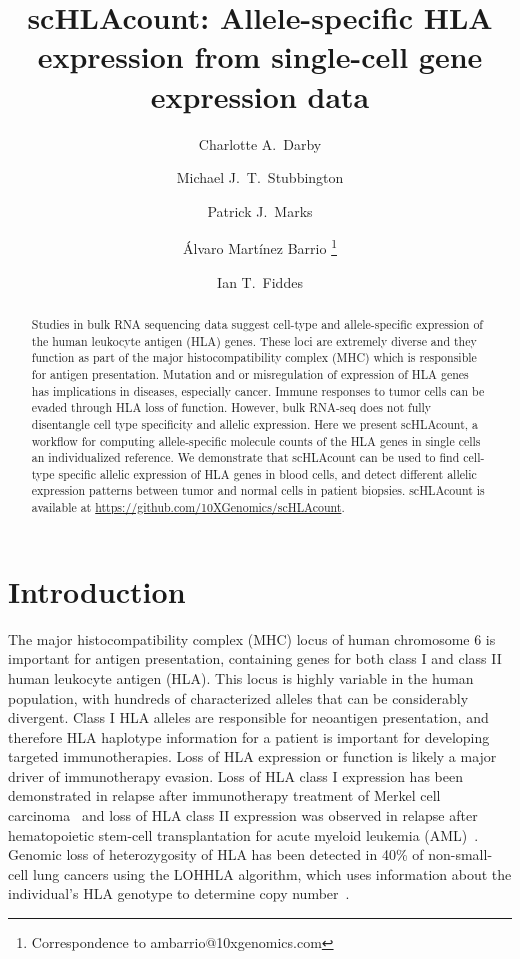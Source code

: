 \documentclass{article}[12pt]
\title{scHLAcount: Allele-specific HLA expression from single-cell gene expression data}
\author[1]{Charlotte A.~Darby}
\author[2]{Michael J.~T.~Stubbington}
\author[2]{Patrick J.~Marks}
\author[2]{Álvaro Martínez Barrio \thanks{Correspondence to ambarrio@10xgenomics.com}}
\author[2]{Ian T.~Fiddes}
\affil[1]{Department of Computer Science, Johns Hopkins University, Baltimore MD}
\affil[2]{10x Genomics, Pleasanton CA}
\begin{document}
\maketitle

\begin{abstract}
Studies in bulk RNA sequencing data suggest cell-type and allele-specific expression of the human leukocyte antigen (HLA) genes. These loci are extremely diverse and they function as part of the major histocompatibility complex (MHC) which is responsible for antigen presentation. Mutation and or misregulation of expression of HLA genes has implications in diseases, especially cancer. Immune responses to tumor cells can be evaded through HLA loss of function. However, bulk RNA-seq does not fully disentangle cell type specificity and allelic expression. Here we present scHLAcount, a workflow for computing allele-specific molecule counts of the HLA genes in single cells an individualized reference. We demonstrate that scHLAcount can be used to find cell-type specific allelic expression of HLA genes in blood cells, and detect different allelic expression patterns between tumor and normal cells in patient biopsies. scHLAcount is available at \url{https://github.com/10XGenomics/scHLAcount}.
\end{abstract}


\section*{Introduction}

The major histocompatibility complex (MHC) locus of human chromosome 6 is important for antigen presentation, containing genes for both class I and class II human leukocyte antigen (HLA). This locus is highly variable in the human population, with hundreds of characterized alleles that can be considerably divergent. Class I HLA alleles are responsible for neoantigen presentation, and therefore HLA haplotype information for a patient is important for developing targeted immunotherapies. Loss of HLA expression or function is likely a major driver of immunotherapy evasion. Loss of HLA class I expression has been demonstrated in relapse after immunotherapy treatment of Merkel cell carcinoma~\parencite{Paulson2018} and loss of HLA class II expression was observed in relapse after hematopoietic stem-cell transplantation for acute myeloid leukemia (AML)~\parencite{Christopher2018}.  Genomic loss of heterozygosity of HLA has been detected in 40\% of non-small-cell lung cancers using the LOHHLA algorithm, which uses information about the individual’s HLA genotype to determine copy number~\parencite{McGranahan2017}.
\end{document}
